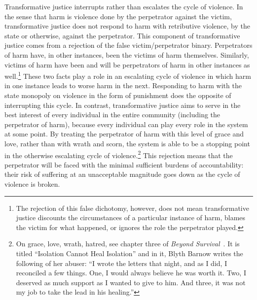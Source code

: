 \documentclass{article}
\begin{document}
        Transformative justice interrupts rather than escalates the cycle of violence. In the sense that harm is violence done by the perpetrator against the victim, transformative justice does not respond to harm with retributive violence, by the state or otherwise, against the perpetrator. This component of transformative justice comes from a rejection of the false victim/perpetrator binary. Perpetrators of harm have, in other instances, been the victims of harm themselves. Similarly, victims of harm have been and will be perpetrators of harm in other instances as well.\footnote{The rejection of this false dichotomy, however, does not mean transformative justice discounts the circumstances of a particular instance of harm, blames the victim for what happened, or ignores the role the perpetrator played.} These two facts play a role in an escalating cycle of violence in which harm in one instance leads to worse harm in the next. Responding to harm with the state monopoly on violence in the form of punishment does the opposite of interrupting this cycle. In contrast, transformative justice aims to serve in the best interest of every individual in the entire community (including the perpetrator of harm), because every individual can play every role in the system at some point. By treating the perpetrator of harm with this level of grace and love, rather than with wrath and scorn, the system is able to be a stopping point in the otherwise escalating cycle of violence.\footnote{On grace, love, wrath, hatred, see chapter three of \textit{Beyond Survival}~\cite{beyond-survival}. It is titled ``Isolation Cannot Heal Isolation'' and in it, Blyth Barnow writes the following of her abuser: ``I wrote the letters that night, and as I did, I reconciled a few things. One, I would always believe he was worth it. Two, I deserved as much support as I wanted to give to him. And three, it was not my job to take the lead in his healing.''} This rejection means that the perpetrator will be faced with the minimal sufficient burdens of accountability: their risk of suffering at an unacceptable magnitude goes down as the cycle of violence is broken.

\end{document}
